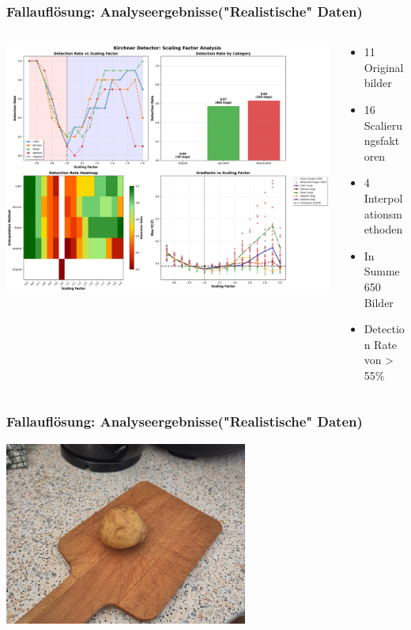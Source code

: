 \documentclass[11pt,t,usepdftitle=false,aspectratio=169]{beamer}
\begin{document}
\begin{frame}
	\frametitle{Fallauflösung: Analyseergebnisse("Realistische" Daten)}
	\begin{columns}[T]
		\begin{column}{0.6\textwidth}
			\includegraphics[width=\textwidth]{images/scaling_analysis_report_full.png}
		\end{column}
		\begin{column}{0.40\textwidth}
			\begin{itemize}
				\item 11 Originalbilder
				\item 16 Scalierungsfaktoren
				\item 4 Interpolationsmethoden
				\item In Summe 650 Bilder
				\item Detection Rate von > 55\%
			\end{itemize}
		\end{column}
	\end{columns}
\end{frame}

\begin{frame}
	\frametitle{Fallauflösung: Analyseergebnisse("Realistische" Daten)}
	\center \includegraphics[width=0.6\textwidth]{images/image_homogen.jpg}
\end{frame}
\end{document}
